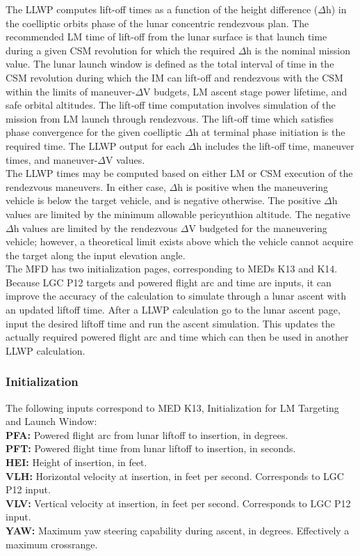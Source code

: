 \documentclass[11pt]{article} %
\begin{document}
The LLWP computes lift-off times as a function of the height difference ($\Delta$h) in the coelliptic orbits phase of the lunar concentric rendezvous plan. The recommended LM time of lift-off from the lunar surface is that launch time during a given CSM revolution for which the required $\Delta$h is the nominal mission value. The lunar launch window is defined as the total interval of time in the CSM revolution during which the IM can lift-off and rendezvous with the CSM within the limits of maneuver-$\Delta$V budgets, LM ascent stage power lifetime, and safe orbital altitudes. The lift-off time computation involves simulation of the mission
from LM launch through rendezvous. The lift-off time which satisfies phase convergence for the given coelliptic $\Delta$h at terminal phase initiation is the required time. The LLWP output for each $\Delta$h includes the lift-off time, maneuver times, and maneuver-$\Delta$V values.\\

The LLWP times may be computed based on either LM or CSM execution of the rendezvous maneuvers. In either case, $\Delta$h is positive when the maneuvering vehicle is below the target vehicle, and is negative otherwise. The positive $\Delta$h values are limited by the minimum allowable pericynthion altitude. The negative $\Delta$h values are limited by the rendezvous $\Delta$V budgeted for the maneuvering vehicle; however, a theoretical limit exists above which the vehicle cannot acquire the target along the input elevation angle.\\

The MFD has two initialization pages, corresponding to MEDs K13 and K14. Because LGC P12 targets and powered flight arc and time are inputs, it can improve the accuracy of the calculation to simulate through a lunar ascent with an updated liftoff time. After a LLWP calculation go to the lunar ascent page, input the desired liftoff time and run the ascent simulation. This updates the actually required powered flight arc and time which can then be used in another LLWP calculation.\\
\newpage
\subsubsection{Initialization}
The following inputs correspond to MED K13, Initialization for LM Targeting and Launch Window:\\

\textbf{PFA:} Powered flight arc from lunar liftoff to insertion, in degrees.\\
\textbf{PFT:} Powered flight time from lunar liftoff to insertion, in seconds.\\
\textbf{HEI:} Height of insertion, in feet.\\
\textbf{VLH:} Horizontal velocity at insertion, in feet per second. Corresponds to LGC P12 input.\\
\textbf{VLV:} Vertical velocity at insertion, in feet per second. Corresponds to LGC P12 input.\\
\textbf{YAW:} Maximum yaw steering capability during ascent, in degrees. Effectively a maximum crossrange.\\
\end{document}
